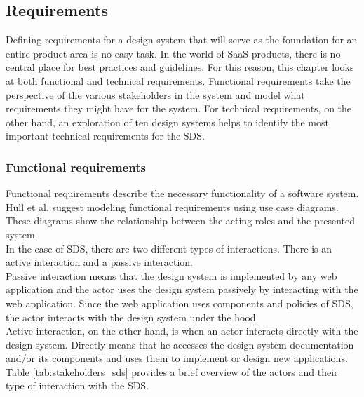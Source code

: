 \subsection{Requirements}\label{sds_requirements}
Defining requirements for a design system that will serve as the foundation for an entire product area is no easy task. In the world of SaaS products, there is no central place for best practices and guidelines. For this reason, this chapter looks at both functional and technical requirements. Functional requirements take the perspective of the various stakeholders in the system and model what requirements they might have for the system. For technical requirements, on the other hand, an exploration of ten design systems helps to identify the most important technical requirements for the \ac{SDS}.
\subsubsection{Functional requirements}
Functional requirements describe the necessary functionality of a software system. Hull et al. suggest modeling functional requirements using use case diagrams. These diagrams show the relationship between the acting roles and the presented system.\cite{hull_requirements_2011} \\
In the case of \ac{SDS}, there are two different types of interactions. There is an active interaction and a passive interaction. \\
Passive interaction means that the design system is implemented by any web application and the actor uses the design system passively by interacting with the web application. Since the web application uses components and policies of \ac{SDS}, the actor interacts with the design system under the hood. \\
Active interaction, on the other hand, is when an actor interacts directly with the design system. Directly means that he accesses the design system documentation and/or its components and uses them to implement or design new applications. \\
Table \ref{tab:stakeholders_sds} provides a brief overview of the actors and their type of interaction with the \ac{SDS}.
